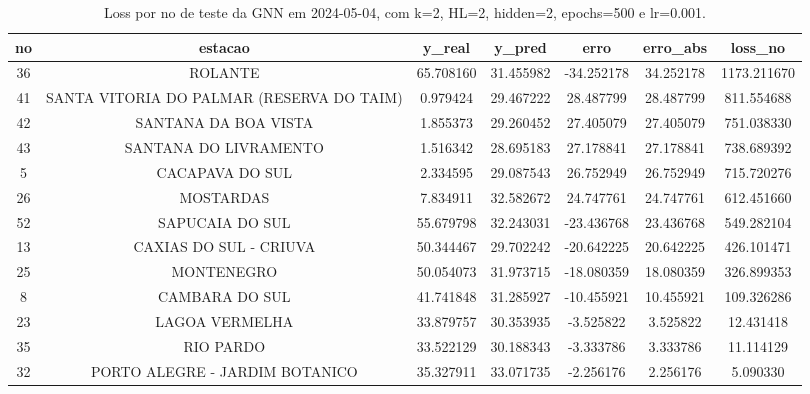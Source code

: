 \begin{table}[h]
\centering
\caption{Loss por no de teste da GNN em 2024-05-04, com k=2, HL=2, hidden=2, epochs=500 e lr=0.001.}
\label{tab:gnn_loss_k2_hl2_h2_e500_d20240504}
\begin{tabular}{ccccccc}
\toprule
no & estacao & y\_real & y\_pred & erro & erro\_abs & loss\_no \\
\midrule
36 & ROLANTE & 65.708160 & 31.455982 & -34.252178 & 34.252178 & 1173.211670 \\
41 & SANTA VITORIA DO PALMAR (RESERVA DO TAIM) & 0.979424 & 29.467222 & 28.487799 & 28.487799 & 811.554688 \\
42 & SANTANA DA BOA VISTA & 1.855373 & 29.260452 & 27.405079 & 27.405079 & 751.038330 \\
43 & SANTANA DO LIVRAMENTO & 1.516342 & 28.695183 & 27.178841 & 27.178841 & 738.689392 \\
5 & CACAPAVA DO SUL & 2.334595 & 29.087543 & 26.752949 & 26.752949 & 715.720276 \\
26 & MOSTARDAS & 7.834911 & 32.582672 & 24.747761 & 24.747761 & 612.451660 \\
52 & SAPUCAIA DO SUL & 55.679798 & 32.243031 & -23.436768 & 23.436768 & 549.282104 \\
13 & CAXIAS DO SUL - CRIUVA & 50.344467 & 29.702242 & -20.642225 & 20.642225 & 426.101471 \\
25 & MONTENEGRO & 50.054073 & 31.973715 & -18.080359 & 18.080359 & 326.899353 \\
8 & CAMBARA DO SUL & 41.741848 & 31.285927 & -10.455921 & 10.455921 & 109.326286 \\
23 & LAGOA VERMELHA & 33.879757 & 30.353935 & -3.525822 & 3.525822 & 12.431418 \\
35 & RIO PARDO & 33.522129 & 30.188343 & -3.333786 & 3.333786 & 11.114129 \\
32 & PORTO ALEGRE - JARDIM BOTANICO & 35.327911 & 33.071735 & -2.256176 & 2.256176 & 5.090330 \\
\bottomrule
\end{tabular}
\end{table}
